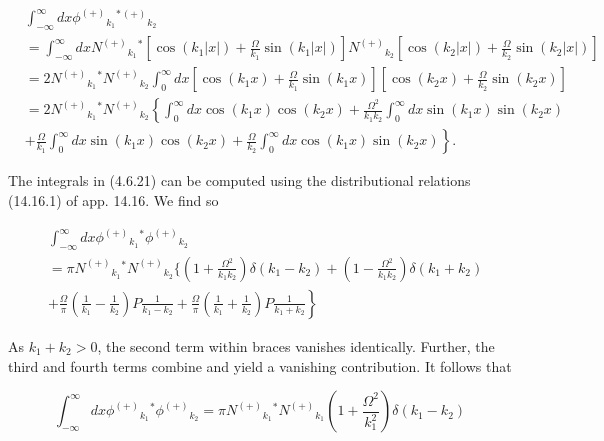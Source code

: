 \documentclass{article}
\begin{document}
\begin{align*}
& \int_{-\infty}^{\infty} d x \phi^{(+)}{ }_{k_{1}}{ }^{*}{ }^{(+)}{ }_{k_{2}}  \tag{4.6.21}\\
&=\int_{-\infty}^{\infty} d x N^{(+)}{ }_{k_{1}}{ }^{*}\left[\cos \left(k_{1}|x|\right)+\frac{\Omega}{k_{1}} \sin \left(k_{1}|x|\right)\right] N^{(+)}{ }_{k_{2}}\left[\cos \left(k_{2}|x|\right)+\frac{\Omega}{k_{2}} \sin \left(k_{2}|x|\right)\right] \\
&=2 N^{(+)}{ }_{k_{1}}{ }^{*} N^{(+)}{ }_{k_{2}} \int_{0}^{\infty} d x\left[\cos \left(k_{1} x\right)+\frac{\Omega}{k_{1}} \sin \left(k_{1} x\right)\right]\left[\cos \left(k_{2} x\right)+\frac{\Omega}{k_{2}} \sin \left(k_{2} x\right)\right] \\
&=2 N^{(+)}{ }_{k_{1}}{ }^{*} N^{(+)}{ }_{k_{2}}\left\{\int_{0}^{\infty} d x \cos \left(k_{1} x\right) \cos \left(k_{2} x\right)+\frac{\Omega^{2}}{k_{1} k_{2}} \int_{0}^{\infty} d x \sin \left(k_{1} x\right) \sin \left(k_{2} x\right)\right. \\
&\left.+\frac{\Omega}{k_{1}} \int_{0}^{\infty} d x \sin \left(k_{1} x\right) \cos \left(k_{2} x\right)+\frac{\Omega}{k_{2}} \int_{0}^{\infty} d x \cos \left(k_{1} x\right) \sin \left(k_{2} x\right)\right\} .
\end{align*}
 

The integrals in (4.6.21) can be computed using the distributional relations (14.16.1)
of app. 14.16. We find so
 
\begin{align*}
& \int_{-\infty}^{\infty} d x \phi^{(+)}{ }_{k_{1}}{ }^{*} \phi^{(+)}{ }_{k_{2}}  \tag{4.6.22}\\
&=\pi N^{(+)}{ }_{k_{1}}{ }^{*} N^{(+)}{ }_{k_{2}}\{\left(1+\frac{\Omega^{2}}{k_{1} k_{2}}\right) \delta\left(k_{1}-k_{2}\right)+\left(1-\frac{\Omega^{2}}{k_{1} k_{2}}\right) \delta\left(k_{1}+k_{2}\right) \\
&\left.+\frac{\Omega}{\pi}\left(\frac{1}{k_{1}}-\frac{1}{k_{2}}\right) P \frac{1}{k_{1}-k_{2}}+\frac{\Omega}{\pi}\left(\frac{1}{k_{1}}+\frac{1}{k_{2}}\right) P \frac{1}{k_{1}+k_{2}}\right\}
\end{align*}
 

As $k_{1}+k_{2}>0$, the second term within braces vanishes identically. Further, the third and fourth terms combine and yield a vanishing contribution. It follows that
 
\begin{equation*}
\int_{-\infty}^{\infty} d x \phi^{(+)}{ }_{k_{1}}{ }^{*} \phi^{(+)}{ }_{k_{2}}=\pi N^{(+)}{ }_{k_{1}}{ }^{*} N^{(+)}{ }_{k_{1}}\left(1+\frac{\Omega^{2}}{k_{1}^{2}}\right) \delta\left(k_{1}-k_{2}\right) \tag{4.6.23}
\end{equation*}
 
\end{document}
